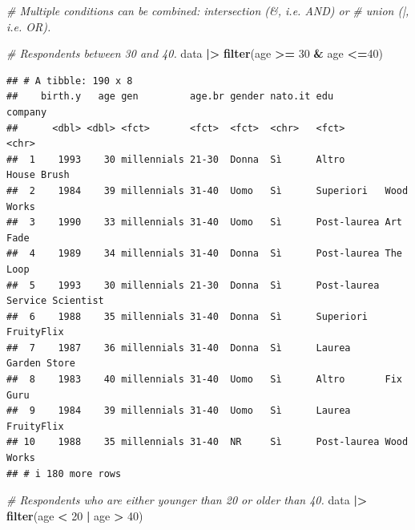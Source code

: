 \documentclass[
]{book}
\newenvironment{Shaded}{\begin{snugshade}}{\end{snugshade}}
\newcommand{\CommentTok}[1]{\textcolor[rgb]{0.56,0.35,0.01}{\textit{#1}}}
\newcommand{\DecValTok}[1]{\textcolor[rgb]{0.00,0.00,0.81}{#1}}
\newcommand{\FunctionTok}[1]{\textcolor[rgb]{0.13,0.29,0.53}{\textbf{#1}}}
\newcommand{\NormalTok}[1]{#1}
\newcommand{\SpecialCharTok}[1]{\textcolor[rgb]{0.81,0.36,0.00}{\textbf{#1}}}
\begin{document}
\begin{Shaded}
\begin{Highlighting}[]
\CommentTok{\# Multiple conditions can be combined: intersection (\&, i.e. AND) or }
\CommentTok{\# union (|, i.e. OR). }

\CommentTok{\# Respondents between 30 and 40.}
\NormalTok{data }\SpecialCharTok{|\textgreater{}} 
  \FunctionTok{filter}\NormalTok{(age }\SpecialCharTok{\textgreater{}=} \DecValTok{30} \SpecialCharTok{\&}\NormalTok{ age }\SpecialCharTok{\textless{}=}\DecValTok{40}\NormalTok{)}
\end{Highlighting}
\end{Shaded}

\begin{verbatim}
## # A tibble: 190 x 8
##    birth.y   age gen         age.br gender nato.it edu         company          
##      <dbl> <dbl> <fct>       <fct>  <fct>  <chr>   <fct>       <chr>            
##  1    1993    30 millennials 21-30  Donna  Sì      Altro       House Brush      
##  2    1984    39 millennials 31-40  Uomo   Sì      Superiori   Wood Works       
##  3    1990    33 millennials 31-40  Uomo   Sì      Post-laurea Art Fade         
##  4    1989    34 millennials 31-40  Donna  Sì      Post-laurea The Loop         
##  5    1993    30 millennials 21-30  Donna  Sì      Post-laurea Service Scientist
##  6    1988    35 millennials 31-40  Donna  Sì      Superiori   FruityFlix       
##  7    1987    36 millennials 31-40  Donna  Sì      Laurea      Garden Store     
##  8    1983    40 millennials 31-40  Uomo   Sì      Altro       Fix Guru         
##  9    1984    39 millennials 31-40  Uomo   Sì      Laurea      FruityFlix       
## 10    1988    35 millennials 31-40  NR     Sì      Post-laurea Wood Works       
## # i 180 more rows
\end{verbatim}

\begin{Shaded}
\begin{Highlighting}[]
\CommentTok{\# Respondents who are either younger than 20 or older than 40.}
\NormalTok{data }\SpecialCharTok{|\textgreater{}} 
  \FunctionTok{filter}\NormalTok{(age }\SpecialCharTok{\textless{}} \DecValTok{20} \SpecialCharTok{|}\NormalTok{ age }\SpecialCharTok{\textgreater{}} \DecValTok{40}\NormalTok{)}
\end{Highlighting}
\end{Shaded}
\end{document}
